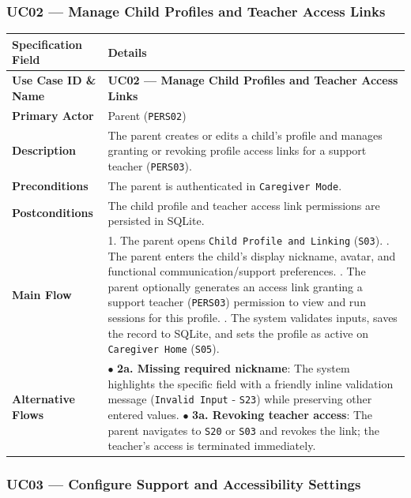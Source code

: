 \subsubsection{UC02 — Manage Child Profiles and Teacher Access Links}


\noindent\begin{xltabular}{\textwidth}{|p{4.0cm}|X|}
\hline
\textbf{Specification Field} & \textbf{Details} \\ \hline
\endhead
\textbf{Use Case ID \& Name} & \textbf{UC02 — Manage Child Profiles and Teacher Access Links} \\ \hline
\textbf{Primary Actor} & Parent (\texttt{PERS02}) \\ \hline
\textbf{Description} & The parent creates or edits a child's profile and manages granting or revoking profile access links for a support teacher (\texttt{PERS03}). \\ \hline
\textbf{Preconditions} & The parent is authenticated in \texttt{Caregiver Mode}. \\ \hline
\textbf{Postconditions} & The child profile and teacher access link permissions are persisted in SQLite. \\ \hline
\textbf{Main Flow} & 1. The parent opens \texttt{Child Profile and Linking} (\texttt{S03}). . The parent enters the child's display nickname, avatar, and functional communication/support preferences. . The parent optionally generates an access link granting a support teacher (\texttt{PERS03}) permission to view and run sessions for this profile. . The system validates inputs, saves the record to SQLite, and sets the profile as active on \texttt{Caregiver Home} (\texttt{S05}). \\ \hline
\textbf{Alternative Flows} & $\bullet$ \textbf{2a. Missing required nickname}: The system highlights the specific field with a friendly inline validation message (\texttt{Invalid Input} - \texttt{S23}) while preserving other entered values. \newline $\bullet$ \textbf{3a. Revoking teacher access}: The parent navigates to \texttt{S20} or \texttt{S03} and revokes the link; the teacher's access is terminated immediately. \\ \hline
\end{xltabular}



\subsubsection{UC03 — Configure Support and Accessibility Settings}


